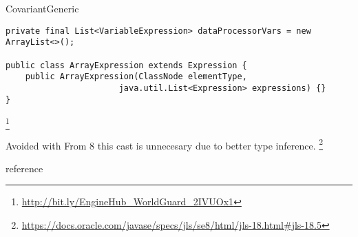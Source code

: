 \begin{pattern}{CovariantGeneric}
\begin{verbatim}
private final List<VariableExpression> dataProcessorVars = new ArrayList<>();

public class ArrayExpression extends Expression {
    public ArrayExpression(ClassNode elementType,
                       java.util.List<Expression> expressions) {}
}
\end{verbatim}


\footnote{\url{http://bit.ly/EngineHub_WorldGuard_2IVUOx1}}



\detection{}

\discussion{}

Avoided with
From \java{} 8 this cast is unnecesary due to better type inference.
\footnote{\url{https://docs.oracle.com/javase/specs/jls/se8/html/jls-18.html\#jls-18.5}}

reference \cite{altidorTamingWildcardsCombining2011}

\end{pattern}
